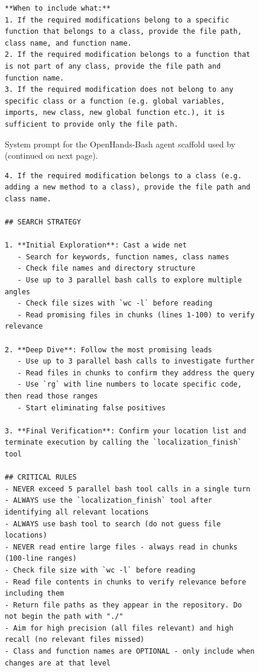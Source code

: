 \begin{figure}[!h]
\begin{tcolorbox}[colback=blue!6!white, colframe=blue!75!black, title=System Prompt for the OpenHands-Bash agent used by \methodname (continued on next page)]
\begin{lstlisting}
**When to include what:**
1. If the required modifications belong to a specific function that belongs to a class, provide the file path, class name, and function name.
2. If the required modification belongs to a function that is not part of any class, provide the file path and function name.
3. If the required modification does not belong to any specific class or a function (e.g. global variables, imports, new class, new global function etc.), it is sufficient to provide only the file path.
\end{lstlisting}
\end{tcolorbox}
\caption{System prompt for the OpenHands-Bash agent scaffold used by \methodname (continued on next page).}
\label{fig:system_prompt1}
\end{figure}

\begin{figure}[!h]
    \centering
\begin{tcolorbox}[colback=blue!6!white, colframe=blue!75!black, title=System Prompt for the OpenHands-Bash agent used by \methodname]
\begin{lstlisting}[basicstyle=\ttfamily\small, breaklines=true, columns=fullflexible]
4. If the required modification belongs to a class (e.g. adding a new method to a class), provide the file path and class name.

## SEARCH STRATEGY

1. **Initial Exploration**: Cast a wide net
   - Search for keywords, function names, class names
   - Check file names and directory structure
   - Use up to 3 parallel bash calls to explore multiple angles
   - Check file sizes with `wc -l` before reading
   - Read promising files in chunks (lines 1-100) to verify relevance

2. **Deep Dive**: Follow the most promising leads
   - Use up to 3 parallel bash calls to investigate further
   - Read files in chunks to confirm they address the query
   - Use `rg` with line numbers to locate specific code, then read those ranges
   - Start eliminating false positives

3. **Final Verification**: Confirm your location list and terminate execution by calling the `localization_finish` tool

## CRITICAL RULES
- NEVER exceed 5 parallel bash tool calls in a single turn
- ALWAYS use the `localization_finish` tool after identifying all relevant locations
- ALWAYS use bash tool to search (do not guess file locations)
- NEVER read entire large files - always read in chunks (100-line ranges)
- Check file size with `wc -l` before reading
- Read file contents in chunks to verify relevance before including them
- Return file paths as they appear in the repository. Do not begin the path with "./"
- Aim for high precision (all files relevant) and high recall (no relevant files missed)
- Class and function names are OPTIONAL - only include when changes are at that level


\end{lstlisting}
\end{tcolorbox}
\end{figure}
